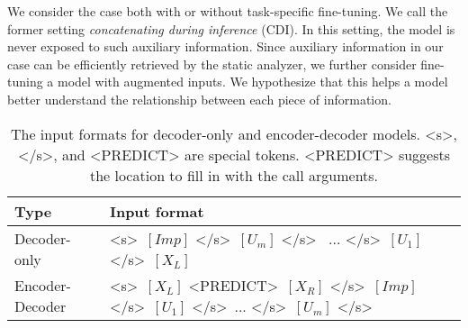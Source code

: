 We consider the case both with or without task-specific fine-tuning. 
We call the former setting \emph{concatenating during inference} (CDI). 
In this setting, the model is never exposed to such auxiliary information.
Since auxiliary information in our case can be efficiently retrieved by the static analyzer, we further consider fine-tuning a model with augmented inputs. 
We hypothesize that this helps a model better understand the relationship between each piece of information.%

\ifaaai

\begin{table*}[ht]
\centering

\begin{tabular}{ll}
\toprule
Type            & Input format                                                                                                                                                                                                                                                              \\
\midrule
Decoder-only    & \textless{}s\textgreater~{$[Imp]$} \textless{}/s\textgreater~$[U_m]$ \textless{}/s\textgreater~ ... \textless{}/s\textgreater~$[U_1]$ \textless{}/s\textgreater~$[X_L]$                                                                        \\
Encoder-Decoder & \textless{}s\textgreater~$[X_L]$  \textless{}PREDICT\textgreater~$[X_R]$ \textless{}/s\textgreater~{$[Imp]$} \textless{}/s\textgreater~$[U_1]$ \textless{}/s\textgreater~... \textless{}/s\textgreater~$[U_m]$ \textless{}/s\textgreater{} \\
\bottomrule
\end{tabular}
\caption{The input formats for decoder-only and encoder-decoder models. \textless{}s\textgreater{}, \textless{}/s\textgreater{}, and \textless{}PREDICT\textgreater{} are special tokens. \textless{}PREDICT\textgreater{} suggests the location to fill in with the call arguments.}
\label{tab:form}
\end{table*}

\fi
